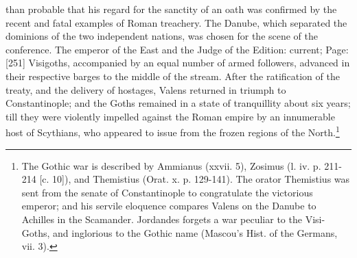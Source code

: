 than probable that his regard for the sanctity of an oath was confirmed by the recent and fatal examples of Roman treachery. The Danube, which separated the dominions of the two independent nations, was chosen for the scene of the conference. The emperor of the East and the Judge of the Edition: current; Page: [251] Visigoths, accompanied by an equal number of armed followers, advanced in their respective barges to the middle of the stream. After the ratification of the treaty, and the delivery of hostages, Valens returned in triumph to Constantinople; and the Goths remained in a state of tranquillity about six years; till they were violently impelled against the Roman empire by an innumerable host of Scythians, who appeared to issue from the frozen regions of the North.\footnote{The Gothic war is described by Ammianus (xxvii. 5), Zosimus (l. iv. p. 211-214 [c. 10]), and Themistius (Orat. x. p. 129-141). The orator Themistius was sent from the senate of Constantinople to congratulate the victorious emperor; and his servile eloquence compares Valens on the Danube to Achilles in the Scamander. Jordandes forgets a war peculiar to the Visi-Goths, and inglorious to the Gothic name (Mascou\texthebrew{}’s Hist. of the Germans, vii. 3).}

